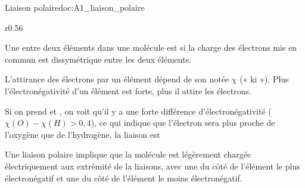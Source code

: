 \begin{doc}{Liaison polaire}{doc:A1_liaison_polaire}
  \begin{wrapfigure}[6]{r}{0.56\linewidth}
    \centering
    \vspace*{-20pt}
    
  \end{wrapfigure}
  \phantom{b}\vspace*{-20pt}
    
  \begin{importants}
    Une  entre deux éléments dans une molécule est  si la charge des électrons mis en commun est dissymétrique entre les deux éléments.
  \end{importants}
  L'attirance des électrons par un élément dépend de son  notée $\chi$ (« ki »).
  Plus l'électronégativité d'un élément est forte, plus il attire les électrons.

  Si on prend  et , on voit qu'il y a une forte différence d'électronégativité ($\chi(O) - \chi(H) > 0,4$), ce qui indique que l'électron sera plus proche de l'oxygène que de l'hydrogène, la liaison  est 

  \begin{importants}  
    Une liaison polaire implique que la molécule est légèrement chargée électriquement aux extrémité de la liaisons, avec une  du côté de l'élément le plus électronégatif et une  du côté de l'élément le moins électronégatif.
  \end{importants}
\end{doc}


